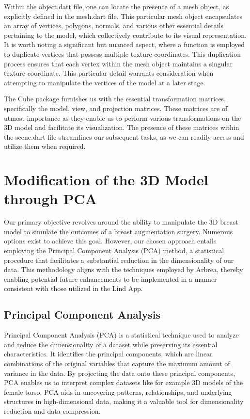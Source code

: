 Within the object.dart file, one can locate the presence of a mesh object, as explicitly defined in the mesh.dart file. This particular mesh object encapsulates an 
array of vertices, polygons, normals, and various other essential details pertaining to the model, which collectively contribute to its visual representation. 
It is worth noting a significant but nuanced aspect, where a function is employed to duplicate vertices that possess multiple texture coordinates. 
This duplication process ensures that each vertex within the mesh object maintains a singular texture coordinate. This particular detail warrants 
consideration when attempting to manipulate the vertices of the model at a later stage.

The Cube package furnishes us with the essential transformation matrices, specifically the model, view, and projection matrices. 
These matrices are of utmost importance as they enable us to perform various transformations on the 3D model and facilitate its visualization. 
The presence of these matrices within the scene.dart file streamlines our subsequent tasks, as we can readily access and utilize them when required.

\section{Modification of the 3D Model through PCA}\label{sec:modification}

Our primary objective revolves around the ability to manipulate the 3D breast model to simulate the outcomes of a breast augmentation surgery. 
Numerous options exist to achieve this goal. However, our chosen approach entails employing the Principal Component Analysis (PCA) method, 
a statistical procedure that facilitates a substantial reduction in the dimensionality of our data. This methodology aligns with the techniques employed by Arbrea, 
thereby enabling potential future enhancements to be implemented in a manner consistent with those utilized in the Lind App.

\subsection{Principal Component Analysis}

Principal Component Analysis (PCA) is a statistical technique used to analyze and reduce the dimensionality of a dataset while preserving its essential characteristics. 
It identifies the principal components, which are linear combinations of the original variables that capture the maximum amount of variance in the data. 
By projecting the data onto these principal components, PCA enables us to interpret complex datasets like for example 3D models of the female torso. PCA aids in uncovering patterns, 
relationships, and underlying structures in high-dimensional data, making it a valuable tool for dimensionality reduction and data compression.

